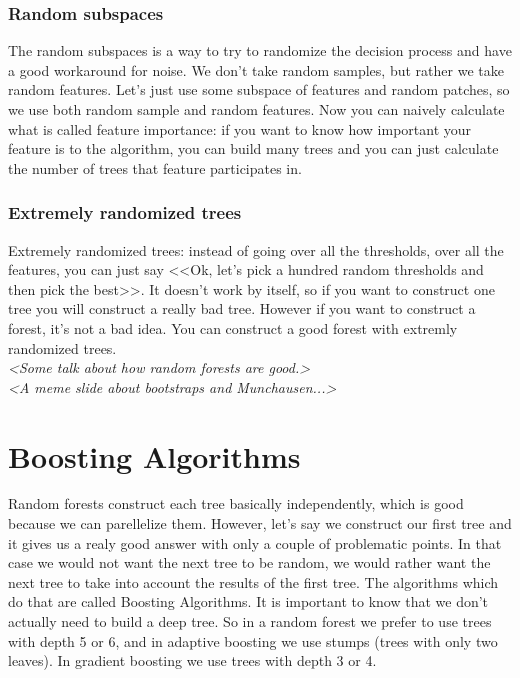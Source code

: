 \subsubsection*{Random subspaces}

The random subspaces is a way to try to randomize the decision process and have a good workaround for noise. We don't take random samples, but rather we take random features. Let's just use some subspace of features and random patches, so we use both random sample and random features. Now you can naively calculate what is called feature importance: if you want to know how important your feature is to the algorithm, you can build many trees and you can just calculate the number of trees that feature participates in. 

\subsubsection*{Extremely randomized trees}

Extremely randomized trees: instead of going over all the thresholds, over all the features, you can just say <<Ok, let's pick a hundred random thresholds and then pick the best>>. It doesn't work by itself, so if you want to construct one tree you will construct a really bad tree. However if you want to construct a forest, it's not a bad idea. You can construct a good forest with extremly randomized trees.\\
{\it <Some talk about how random forests are good.>}\\
{\it <A meme slide about bootstraps and Munchausen...>}

\section{Boosting Algorithms}

Random forests construct each tree basically independently, which is good because we can parellelize them. However, let's say we construct our first tree and it gives us a realy good answer with only a couple of problematic points. In that case we would not want the next tree to be random, we would rather want the next tree to take into account the results of the first tree. The algorithms which do that are called Boosting Algorithms. It is important to know that we don't actually need to build a deep tree. So in a random forest we prefer to use trees with depth 5 or 6, and in adaptive boosting we use stumps (trees with only two leaves). In gradient boosting we use trees with depth 3 or 4. 

